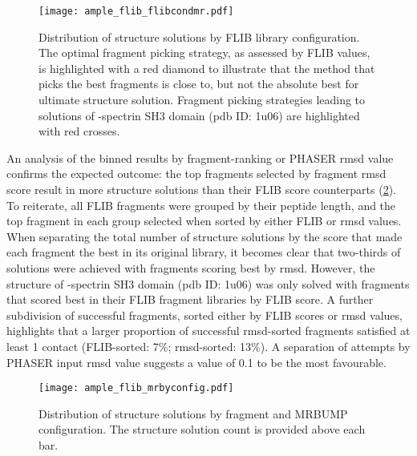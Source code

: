 \begin{figure}[H]
	\centering
	\texttt{[image: ample\_flib\_flibcondmr.pdf]}
	\caption[MR structure solutions by FLIB library]{Distribution of structure solutions by FLIB library configuration. The optimal fragment picking strategy, as assessed by FLIB values, is highlighted with a red diamond to illustrate that the method that picks the best fragments is close to, but not the absolute best for ultimate structure solution. Fragment picking strategies leading to solutions of \textalpha-spectrin SH3 domain (\gls{pdb} ID: 1u06) are highlighted with red crosses.}
	\label{fig:ample_flib_flibcondmr}
\end{figure}

An analysis of the binned results by fragment-ranking or PHASER \gls{rmsd} value confirms the expected outcome: the top fragments selected by fragment \gls{rmsd} score result in more structure solutions than their FLIB score counterparts (\cref{fig:ample_flib_mrbyconfig}). To reiterate, all FLIB fragments were grouped by their peptide length, and the top fragment in each group selected when sorted by either FLIB or \gls{rmsd} values. When separating the total number of structure solutions by the score that made each fragment the best in its original library, it becomes clear that two-thirds of solutions were achieved with fragments scoring best by \gls{rmsd}. However, the structure of \textalpha-spectrin SH3 domain (\gls{pdb} ID: 1u06) was only solved with fragments that scored best in their FLIB fragment libraries by FLIB score. A further subdivision of successful fragments, sorted either by FLIB scores or \gls{rmsd} values, highlights that a larger proportion of successful \gls{rmsd}-sorted fragments satisfied at least 1 contact (FLIB-sorted: 7\%; \gls{rmsd}-sorted: 13\%). A separation of attempts by PHASER input \gls{rmsd} value suggests a value of 0.1 to be the most favourable.

\begin{figure}[H]
	\centering
	\texttt{[image: ample\_flib\_mrbyconfig.pdf]}
	\caption[MR structure solutions by input parameters]{Distribution of structure solutions by fragment and MRBUMP configuration. The structure solution count is provided above each bar.}
	\label{fig:ample_flib_mrbyconfig}
\end{figure}

